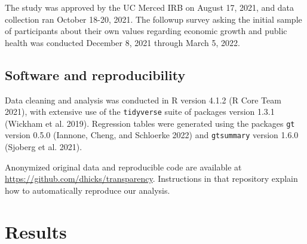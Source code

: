 \documentclass[
  letterpaper,
  DIV=11,
  numbers=noendperiod]{scrartcl}
\begin{document}
\hypertarget{tbl-condition}{}
\begin{table}
\caption{\label{tbl-condition}Assignment of participants to conditions }\tabularnewline

\centering
{}
\end{table}

The study was approved by the UC Merced IRB on August 17, 2021, and data
collection ran October 18-20, 2021. The followup survey asking the
initial sample of participants about their own values regarding economic
growth and public health was conducted December 8, 2021 through March 5,
2022.

\hypertarget{software-and-reproducibility}{%
\subsection{Software and
reproducibility}\label{software-and-reproducibility}}

Data cleaning and analysis was conducted in R version 4.1.2 (R Core Team
2021), with extensive use of the \texttt{tidyverse} suite of packages
version 1.3.1 (Wickham et al. 2019). Regression tables were generated
using the packages \texttt{gt} version 0.5.0 (Iannone, Cheng, and
Schloerke 2022) and \texttt{gtsummary} version 1.6.0 (Sjoberg et al.
2021).

Anonymized original data and reproducible code are available at
\url{https://github.com/dhicks/transparency}. Instructions in that
repository explain how to automatically reproduce our analysis.

\hypertarget{results}{%
\section{Results}\label{results}}
\end{document}
